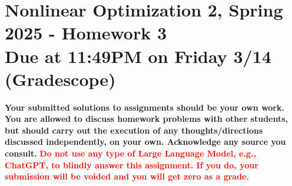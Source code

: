 \documentclass[11pt]{article}
\date{}
\title{}
\begin{document}
\section*{\textbf{Nonlinear Optimization 2, Spring 2025 - Homework 3} \\ Due at 11:49PM on Friday 3/14 (Gradescope)}
\label{sec:org4d01b39}
\textbf{Your submitted solutions to assignments should be your own work. You are allowed to discuss homework problems with other students, but should carry out the execution of any thoughts/directions discussed independently, on your own. Acknowledge any source you consult.}
\textbf{\textcolor{red}{Do not use any type of Large Language Model, e.g., ChatGPT, to blindly answer this assignment. If you do, your submission will be voided and you will get zero as a grade.}} \vspace{.5cm}
\end{document}
